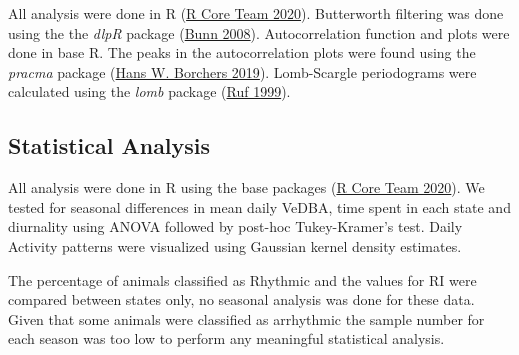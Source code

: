 \documentclass[english,msc,numbers,hidelinks]{coppe}
\begin{document}
  All analysis were done in R (\protect\hyperlink{ref-rcoreteam2020}{R Core Team 2020}). Butterworth filtering was done using the the \emph{dlpR} package (\protect\hyperlink{ref-bunn2008}{Bunn 2008}). Autocorrelation function and plots were done in base R. The peaks in the autocorrelation plots were found using the \emph{pracma} package (\protect\hyperlink{ref-hansw.borchers2019}{Hans W. Borchers 2019}). Lomb-Scargle periodograms were calculated using the \emph{lomb} package (\protect\hyperlink{ref-ruf1999}{Ruf 1999}).

  \hypertarget{statistical-analysis}{%
  \subsection{Statistical Analysis}\label{statistical-analysis}}

  All analysis were done in R using the base packages (\protect\hyperlink{ref-rcoreteam2020}{R Core Team 2020}). We tested for seasonal differences in mean daily VeDBA, time spent in each state and diurnality using ANOVA followed by post-hoc Tukey-Kramer's test. Daily Activity patterns were visualized using Gaussian kernel density estimates.

  The percentage of animals classified as Rhythmic and the values for RI were compared between states only, no seasonal analysis was done for these data. Given that some animals were classified as arrhythmic the sample number for each season was too low to perform any meaningful statistical analysis.

  \newpage
\end{document}
